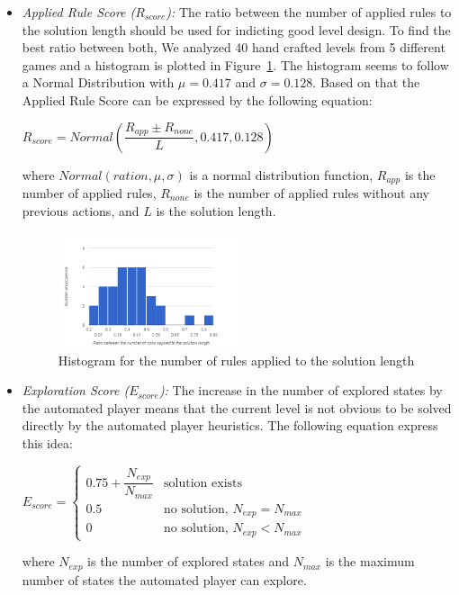 \documentclass[letterpaper]{article}
\newcommand{\figref}[1]{Figure~\ref{Figure:#1}}
\begin{document}
\begin{itemize}
	\item \emph{Applied Rule Score ($R_{score}$):} The ratio between the number of applied rules to the solution length should be used for indicting good level design. To find the best ratio between both, We analyzed 40 hand crafted levels from 5 different games and a histogram is plotted in \figref{rulesSolutionLengthHistogram}. The histogram seems to follow a Normal Distribution with $\mu = 0.417$ and $\sigma = 0.128$. Based on that the Applied Rule Score can be expressed by the following equation:
	\begin{center}$R_{score} = Normal(\dfrac{R_{app} \pm R_{none}}{L}, 0.417, 0.128)$\end{center}
	where $Normal(ration, \mu, \sigma)$ is a normal distribution function, $R_{app}$ is the number of applied rules, $R_{none}$ is the number of applied rules without any previous actions, and $L$ is the solution length.
	\begin{figure}
		\centering
		\includegraphics[width=0.5\textwidth]{Images/rulesSolutionLengthHistogram}
		\caption{Histogram for the number of rules applied to the solution length}
		\label{Figure:rulesSolutionLengthHistogram}
	\end{figure}
	
	\item \emph{Exploration Score ($E_{score}$):} The increase in the number of explored states by the automated player means that the current level is not obvious to be solved directly by the automated player heuristics. The following equation express this idea:
	\begin{center}
	$E_{score}= \begin{cases}
	               0.75 + \dfrac{N_{exp}}{N_{max}} & \text{solution exists}\\
	               0.5 & \text{no solution, }N_{exp} = N_{max}\\
	               0 & \text{no solution, }N_{exp} < N_{max}
	           \end{cases}$
	\end{center}
	where $N_{exp}$ is the number of explored states and $N_{max}$ is the maximum number of states the automated player can explore.
\end{itemize}
\end{document}
